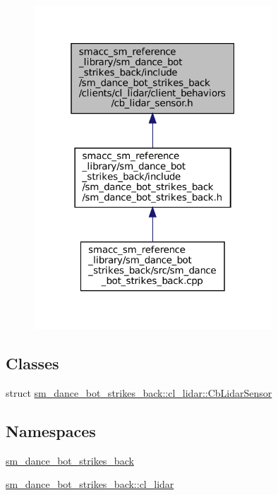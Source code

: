 \begin{figure}[H]
\begin{center}
\leavevmode
\includegraphics[width=253pt]{sm__dance__bot__strikes__back_2include_2sm__dance__bot__strikes__back_2clients_2cl__lidar_2clien3b4fc338368c67ee3fedce298644df42}
\end{center}
\end{figure}
\subsection*{Classes}
\begin{DoxyCompactItemize}
\item 
struct \hyperlink{structsm__dance__bot__strikes__back_1_1cl__lidar_1_1CbLidarSensor}{sm\+\_\+dance\+\_\+bot\+\_\+strikes\+\_\+back\+::cl\+\_\+lidar\+::\+Cb\+Lidar\+Sensor}
\end{DoxyCompactItemize}
\subsection*{Namespaces}
\begin{DoxyCompactItemize}
\item 
 \hyperlink{namespacesm__dance__bot__strikes__back}{sm\+\_\+dance\+\_\+bot\+\_\+strikes\+\_\+back}
\item 
 \hyperlink{namespacesm__dance__bot__strikes__back_1_1cl__lidar}{sm\+\_\+dance\+\_\+bot\+\_\+strikes\+\_\+back\+::cl\+\_\+lidar}
\end{DoxyCompactItemize}
